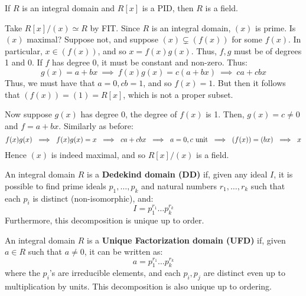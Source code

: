 \begin{thm}
    If $ R $ is an integral domain and $ R[x] $ is a PID, then $ R $ is a field.
\end{thm}

\begin{pf}[source=Primary Source Material]
    Take $ R[x]/(x) \simeq R $ by FIT. Since $ R $ is an integral domain, $ (x) $ is prime.
    Is $ (x) $ maximal? \vsp
    Suppose not, and suppose $ (x) \subsetneq (f(x)) $ for some $ f(x) $.
    In particular, $ x \in (f(x)) $, and so $ x = f(x)g(x) $. Thus, $ f, g $ must be of degrees
    1 and 0. \vsp
    If $ f $ has degree 0, it must be constant and non-zero. Thus:
    \begin{equation*}
        g(x) = a+bx \ \implies \ f(x)g(x) = c(a+bx) \ \implies \ ca + cbx
    \end{equation*}
    Thus, we must have that $ a = 0, cb = 1 $, and so $ f(x) = 1 $. But then it follows that
    $ (f(x)) = (1) = R[x] $, which is not a proper subset. \npgh

    Now suppose $ g(x) $ has degree 0, the degree of $ f(x) $ is 1.
    Then, $ g(x) = c \neq 0 $ and $ f = a+bx $. Similarly as before:
    \begin{equation*}
        f(x)g(x) \ \implies \ f(x)g(x) = x \ \implies \  ca + cbx \ \implies \ a = 0, c \trm{ unit}
        \ \implies \ (f(x)) = (bx) \ \implies \ x
    \end{equation*}
    Hence $ (x) $ is indeed maximal, and so $ R[x]/(x) $ is a field.
\end{pf}

\begin{defn}
    An integral domain $ R $ is a \textbf{Dedekind domain (DD)} if, given any ideal $ I $, it
    is possible to find prime ideals $ p_{1}, \dots, p_{k} $ and natural numbers
    $ r_{1}, \dots, r_{k} $ such that each $ p_{i} $ is distinct (non-isomorphic), and:
    \begin{equation*}
        I = p_{1}^{r_{1}}\dots p_{k}^{r_{k}}
    \end{equation*}
    Furthermore, this decomposition is unique up to order.
\end{defn}

\begin{defn}
    An integral domain $ R $ is a \textbf{Unique Factorization domain (UFD)} if, given $ a \in R $
    such that $ a \neq 0 $, it can be written as:
    \begin{equation*}
        a = p_{1}^{r_{1}}\dots p_{k}^{r_{k}}
    \end{equation*}
    where the $ p_{i} $'s are irreducible elements, and each $ p_{i}, p_{j} $ are distinct even
    up to multiplication by units. This decomposition is also unique up to ordering.
\end{defn}

